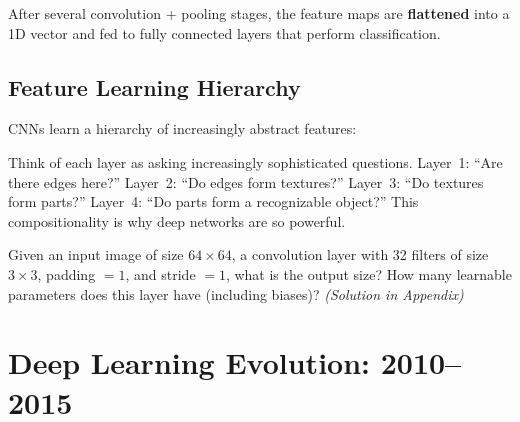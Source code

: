 \documentclass[11pt,a4paper]{article}
\begin{document}
After several convolution + pooling stages, the feature maps are \textbf{flattened} into a 1D vector and fed to fully connected layers that perform classification.

\subsection{Feature Learning Hierarchy}

CNNs learn a hierarchy of increasingly abstract features:

\begin{center}
\end{center}

\begin{tcolorbox}[intuitionbox={Intuition}]
Think of each layer as asking increasingly sophisticated questions. Layer~1: ``Are there edges here?'' Layer~2: ``Do edges form textures?'' Layer~3: ``Do textures form parts?'' Layer~4: ``Do parts form a recognizable object?'' This compositionality is why deep networks are so powerful.
\end{tcolorbox}

\begin{tcolorbox}[questionbox={Self-Check Q3}]
Given an input image of size $64 \times 64$, a convolution layer with 32 filters of size $3 \times 3$, padding $= 1$, and stride $= 1$, what is the output size? How many learnable parameters does this layer have (including biases)? \textit{(Solution in Appendix)}
\end{tcolorbox}

\section{Deep Learning Evolution: 2010--2015}
\end{document}

